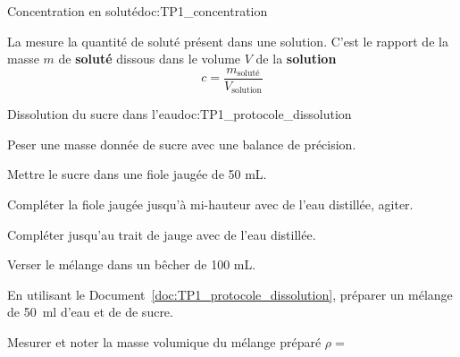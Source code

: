 

\begin{doc}{Concentration en soluté}{doc:TP1_concentration}
  \begin{importants}
    La  mesure la quantité de soluté présent dans une solution.
    C'est le rapport de la masse $m$ de \textbf{soluté} dissous dans le volume $V$ de la \textbf{solution}
    \begin{equation*}
      c = \frac{m_\text{soluté}}{V_\text{solution}}
    \end{equation*} 
  \end{importants}
\end{doc}


\begin{doc}{Dissolution du sucre dans l'eau}{doc:TP1_protocole_dissolution}
  \begin{protocole}
      \item Peser une masse donnée de sucre avec une balance de précision.
      \item Mettre le sucre dans une fiole jaugée de 50 mL.
      \item Compléter la fiole jaugée jusqu'à mi-hauteur avec de l'eau distillée, agiter.
      \item Compléter jusqu'au trait de jauge avec de l'eau distillée.
      \item Verser le mélange dans un bêcher de 100 mL.
  \end{protocole}
\end{doc}


\newpage
\vspace*{-28pt}

\mesure
En utilisant le Document~\ref{doc:TP1_protocole_dissolution}, préparer un mélange de \qty{50}{\ml} d'eau et de de sucre.

\mesure
Mesurer et noter la masse volumique du mélange préparé $\rho =$ 




